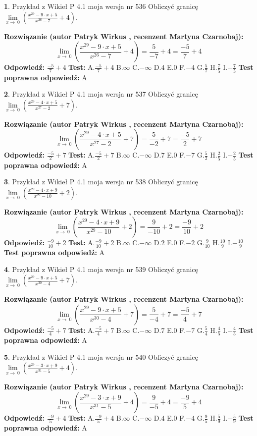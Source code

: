 \documentclass[12pt, a4paper]{article}
\theoremstyle{definition} %
\newtheorem{zad}{}
\newcommand{\zadStart}[1]{\begin{zad}#1\newline}
\newcommand{\zadStop}{\end{zad}}
\newcommand{\rozwStart}[2]{\noindent \textbf{Rozwiązanie (autor #1 , recenzent #2): }\newline}
\newcommand{\rozwStop}{\newline}
\newcommand{\odpStart}{\noindent \textbf{Odpowiedź:}\newline}
\newcommand{\odpStop}{\newline}
\newcommand{\testStart}{\noindent \textbf{Test:}\newline}
\newcommand{\testStop}{\newline}
\newcommand{\kluczStart}{\noindent \textbf{Test poprawna odpowiedź:}\newline}
\newcommand{\kluczStop}{\newline}
\begin{document}
\zadStart{Przykład z Wikieł P 4.1 moja wersja nr 536}
Obliczyć granicę $\lim\limits_{x\to\ 0}(\frac{x^{29}-9 \cdot x +5}{x^{26}-7}+4)$.
\zadStop
\rozwStart{Patryk Wirkus}{Martyna Czarnobaj}
$$\lim\limits_{x\to\ 0}(\frac{x^{29}-9 \cdot x +5}{x^{26}-7}+4)=\frac{5}{-7}+4=\frac{-5}{7}+4$$
\rozwStop
\odpStart
$\frac{-5}{7}+4$
\odpStop
\testStart
A.$\frac{-5}{7}+4$
B.$\infty$
C.$-\infty$
D.$4$
E.$0$
F.$-4$
G.$\frac{5}{7}$
H.$\frac{7}{5}$
I.$-\frac{7}{5}$
\testStop
\kluczStart
A
\kluczStop



\zadStart{Przykład z Wikieł P 4.1 moja wersja nr 537}
Obliczyć granicę $\lim\limits_{x\to\ 0}(\frac{x^{29}-4 \cdot x +5}{x^{27}-2}+7)$.
\zadStop
\rozwStart{Patryk Wirkus}{Martyna Czarnobaj}
$$\lim\limits_{x\to\ 0}(\frac{x^{29}-4 \cdot x +5}{x^{27}-2}+7)=\frac{5}{-2}+7=\frac{-5}{2}+7$$
\rozwStop
\odpStart
$\frac{-5}{2}+7$
\odpStop
\testStart
A.$\frac{-5}{2}+7$
B.$\infty$
C.$-\infty$
D.$7$
E.$0$
F.$-7$
G.$\frac{5}{2}$
H.$\frac{2}{5}$
I.$-\frac{2}{5}$
\testStop
\kluczStart
A
\kluczStop



\zadStart{Przykład z Wikieł P 4.1 moja wersja nr 538}
Obliczyć granicę $\lim\limits_{x\to\ 0}(\frac{x^{29}-4 \cdot x +9}{x^{29}-10}+2)$.
\zadStop
\rozwStart{Patryk Wirkus}{Martyna Czarnobaj}
$$\lim\limits_{x\to\ 0}(\frac{x^{29}-4 \cdot x +9}{x^{29}-10}+2)=\frac{9}{-10}+2=\frac{-9}{10}+2$$
\rozwStop
\odpStart
$\frac{-9}{10}+2$
\odpStop
\testStart
A.$\frac{-9}{10}+2$
B.$\infty$
C.$-\infty$
D.$2$
E.$0$
F.$-2$
G.$\frac{9}{10}$
H.$\frac{10}{9}$
I.$-\frac{10}{9}$
\testStop
\kluczStart
A
\kluczStop



\zadStart{Przykład z Wikieł P 4.1 moja wersja nr 539}
Obliczyć granicę $\lim\limits_{x\to\ 0}(\frac{x^{29}-9 \cdot x +5}{x^{30}-4}+7)$.
\zadStop
\rozwStart{Patryk Wirkus}{Martyna Czarnobaj}
$$\lim\limits_{x\to\ 0}(\frac{x^{29}-9 \cdot x +5}{x^{30}-4}+7)=\frac{5}{-4}+7=\frac{-5}{4}+7$$
\rozwStop
\odpStart
$\frac{-5}{4}+7$
\odpStop
\testStart
A.$\frac{-5}{4}+7$
B.$\infty$
C.$-\infty$
D.$7$
E.$0$
F.$-7$
G.$\frac{5}{4}$
H.$\frac{4}{5}$
I.$-\frac{4}{5}$
\testStop
\kluczStart
A
\kluczStop



\zadStart{Przykład z Wikieł P 4.1 moja wersja nr 540}
Obliczyć granicę $\lim\limits_{x\to\ 0}(\frac{x^{29}-3 \cdot x +9}{x^{31}-5}+4)$.
\zadStop
\rozwStart{Patryk Wirkus}{Martyna Czarnobaj}
$$\lim\limits_{x\to\ 0}(\frac{x^{29}-3 \cdot x +9}{x^{31}-5}+4)=\frac{9}{-5}+4=\frac{-9}{5}+4$$
\rozwStop
\odpStart
$\frac{-9}{5}+4$
\odpStop
\testStart
A.$\frac{-9}{5}+4$
B.$\infty$
C.$-\infty$
D.$4$
E.$0$
F.$-4$
G.$\frac{9}{5}$
H.$\frac{5}{9}$
I.$-\frac{5}{9}$
\testStop
\kluczStart
A
\kluczStop
\end{document}
